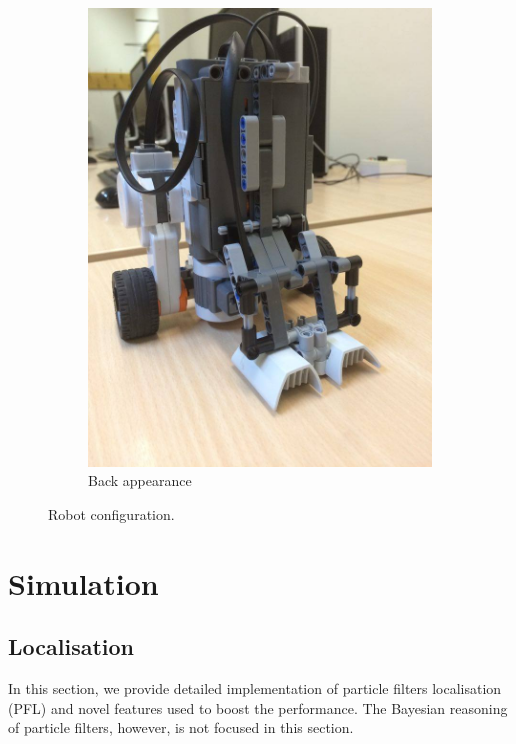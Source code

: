 \documentclass[12pt]{article}
\begin{document}
\begin{figure}[h]
\begin{subfigure}{0.25\textwidth}
  \includegraphics[scale=0.15]{b}
  \caption{Back appearance} \label{fig:backrobot}
  \end{subfigure}
  \caption{Robot configuration.}
  \label{fig:robotconfig}
\end{figure}

\section{Simulation}
\subsection{Localisation}
In this section, we provide detailed implementation of particle filters localisation (PFL) and novel features used to boost the performance. The Bayesian reasoning of particle filters, however, is not focused in this section.
\end{document}
